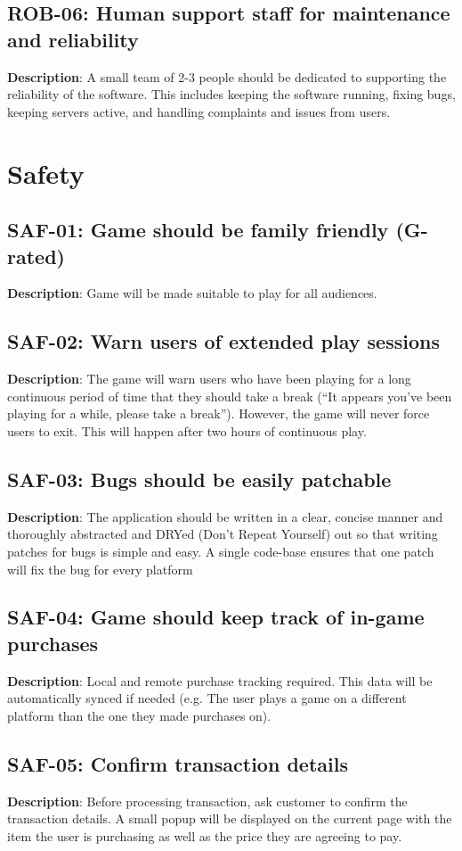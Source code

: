 \subsection{ROB-06: Human support staff for maintenance and reliability}
\textbf{Description}: A small team of 2-3 people should be dedicated to supporting
the reliability of the software. This includes keeping the software
running, fixing bugs, keeping servers active, and handling complaints
and issues from users.
\section{Safety}
\subsection{SAF-01: Game should be family friendly (G-rated)}
\textbf{Description}: Game will be made suitable to play for all audiences.
\subsection{SAF-02: Warn users of extended play sessions}
\textbf{Description}: The game will warn users who have been playing for a
long continuous period of time that they should take a break (\textquotedblleft{}It
appears you\textquoteright{}ve been playing for a while, please take
a break\textquotedblright{}). However, the game will never force users
to exit. This will happen after two hours of continuous play.
\subsection{SAF-03: Bugs should be easily patchable}
\textbf{Description}: The application should be written in a clear, concise
manner and thoroughly abstracted and DRYed (Don\textquoteright{}t
Repeat Yourself) out so that writing patches for bugs is simple and
easy. A single code-base ensures that one patch will fix the bug for
every platform
\subsection{SAF-04: Game should keep track of in-game purchases}
\textbf{Description}: Local and remote purchase tracking required. This data
will be automatically synced if needed (e.g. The user plays a game
on a different platform than the one they made purchases on). 
\subsection{SAF-05: Confirm transaction details}
\textbf{Description}: Before processing transaction, ask customer to confirm
the transaction details. A small popup will be displayed on the current
page with the item the user is purchasing as well as the price they
are agreeing to pay.
